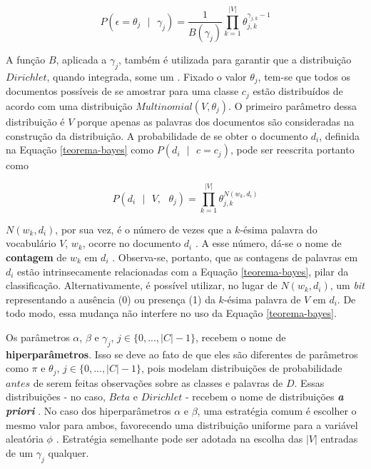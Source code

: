 \begin{equation}
\label{dirichlet}
  \ensuremath{P(\epsilon = \theta_j\mbox{ } |\mbox{ } \gamma_j) = \frac{1}{B(\gamma_j)}\prod_{k = 1}^{|V|}\theta_{j,k}^{\gamma_{j,k} - 1}}
\end{equation}

A função \ensuremath{B}, aplicada a \ensuremath{\gamma_j}, também é utilizada para garantir que a distribuição \ensuremath{Dirichlet}, quando integrada, some um \cite{stat-distribs}. Fixado o valor \ensuremath{\theta_j}, tem-se que todos os documentos possíveis de se amostrar para uma classe \ensuremath{c_j} estão distribuídos de acordo com uma distribuição \ensuremath{Multinomial(V, \theta_j)}. O primeiro parâmetro dessa distribuição é \ensuremath{V} porque apenas as palavras dos documentos são consideradas na construção da distribuição. A probabilidade de se obter o documento \ensuremath{d_i}, definida na Equação \ref{teorema-bayes} como \ensuremath{P(d_i\mbox{ }|\mbox{ }c = c_j)}, pode ser reescrita portanto como \cite{resnik}

\begin{equation}
\label{multinomial}
\ensuremath{P(d_i\mbox{ } |\mbox{ } V,\mbox{ } \theta_j)  = \prod_{k = 1}^{|V|}\theta_{j,k}^{N(w_k, d_i)}}
\end{equation}

\ensuremath{N(w_k, d_i)}, por sua vez, é o número de vezes que a \ensuremath{k}-ésima palavra do vocabulário \ensuremath{V}, \ensuremath{w_k}, ocorre no documento \ensuremath{d_i} \cite{resnik}. A esse número, dá-se o nome de \textbf{contagem} de \ensuremath{w_k} em \ensuremath{d_i} \cite{nigam}. Observa-se, portanto, que as contagens de palavras em \ensuremath{d_i} estão intrinsecamente relacionadas com a Equação \ref{teorema-bayes}, pilar da classificação. Alternativamente, é possível utilizar, no lugar de \ensuremath{N(w_k, d_i)}, um \emph{bit} representando a ausência (0) ou presença (1) da \ensuremath{k}-ésima palavra de \ensuremath{V} em \ensuremath{d_i}. De todo modo, essa mudança não interfere no uso da Equação \ref{teorema-bayes}.

Os parâmetros \ensuremath{\alpha}, \ensuremath{\beta} e \ensuremath{\gamma_j}, \ensuremath{j \in \{0, ..., |C| - 1\}}, recebem o nome de \textbf{hiperparâmetros}. Isso se deve ao fato de que eles são diferentes de parâmetros como \ensuremath{\pi} e \ensuremath{\theta_j}, \ensuremath{j \in \{0, ..., |C| - 1\}}, pois modelam distribuições de probabilidade \ensuremath{antes} de serem feitas observações sobre as classes e palavras de \ensuremath{D}. Essas distribuições - no caso, \ensuremath{Beta} e \ensuremath{Dirichlet} - recebem o nome de distribuições \textbf{\emph{a priori}} \cite{bishop}. No caso dos hiperparâmetros \ensuremath{\alpha} e \ensuremath{\beta}, uma estratégia comum é escolher o mesmo valor para ambos, favorecendo uma distribuição uniforme para a variável aleatória \ensuremath{\phi} \cite{nigam}. Estratégia semelhante pode ser adotada na escolha das \ensuremath{|V|} entradas de um \ensuremath{\gamma_j} qualquer.

